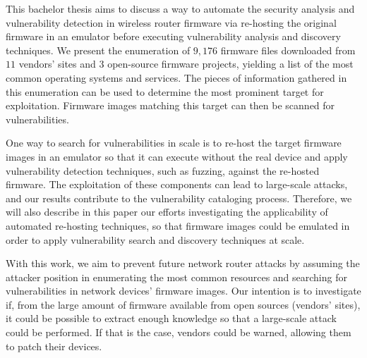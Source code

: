 This bachelor thesis aims to discuss a way to automate the security analysis and vulnerability detection in wireless router firmware via re-hosting the original firmware in an emulator before executing vulnerability analysis and discovery techniques. We present the enumeration of $9,176$ firmware files downloaded from $11$ vendors' sites and $3$ open-source firmware projects, yielding a list of the most common operating systems and services. The pieces of information gathered in this enumeration can be used to determine the most prominent target for exploitation. Firmware images matching this target can then be scanned for vulnerabilities. 

One way to search for vulnerabilities in scale is to re-host the target firmware images in an emulator so that it can execute without the real device and apply vulnerability detection techniques, such as fuzzing, against the re-hosted firmware. The exploitation of these components can lead to large-scale attacks, and our results contribute to the vulnerability cataloging process. Therefore, we will also describe in this paper our efforts investigating the applicability of automated re-hosting techniques, so that firmware images could be emulated in order to apply vulnerability search and discovery techniques at scale.

With this work, we aim to prevent future network router attacks by assuming the attacker position in enumerating the most common resources and searching for vulnerabilities in network devices' firmware images. Our intention is to investigate if, from the large amount of firmware available from open sources (vendors' sites), it could be possible to extract enough knowledge so that a large-scale attack could be performed. If that is the case, vendors could be warned, allowing them to patch their devices.



